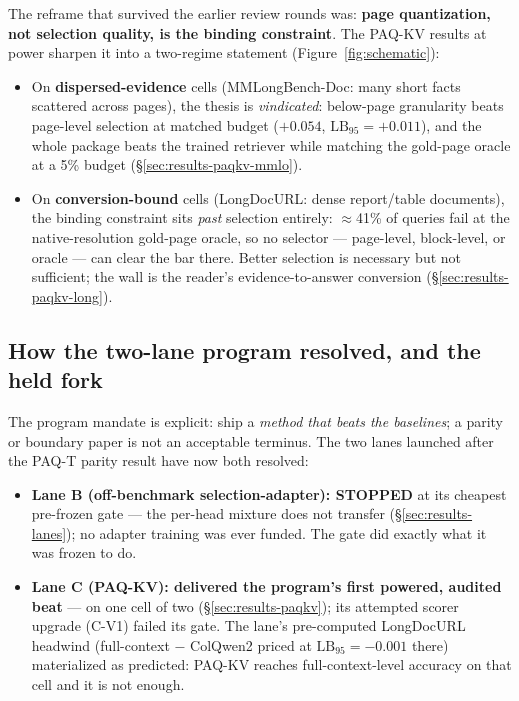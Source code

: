 \documentclass[11pt,letterpaper]{article}
\newcommand{\paqt}{\textsc{PAQ-T}}
\newcommand{\paqc}{\textsc{PAQ-KV}}
\newcommand{\lb}{\mathrm{LB}_{95}}
\begin{document}
The reframe that survived the earlier review rounds was: \textbf{page quantization, not
selection quality, is the binding constraint}. The \paqc{} results at power sharpen it into a
two-regime statement (Figure~\ref{fig:schematic}):
\begin{itemize}
  \item On \textbf{dispersed-evidence} cells (MMLongBench-Doc: many short facts scattered
        across pages), the thesis is \emph{vindicated}: below-page granularity beats
        page-level selection at matched budget ($+0.054$, $\lb=+0.011$), and the whole package
        beats the trained retriever while matching the gold-page oracle at a 5\% budget
        (\S\ref{sec:results-paqkv-mmlo}).
  \item On \textbf{conversion-bound} cells (LongDocURL: dense report/table documents), the
        binding constraint sits \emph{past} selection entirely: $\approx$41\% of queries fail
        at the native-resolution gold-page oracle, so no selector --- page-level, block-level,
        or oracle --- can clear the bar there. Better selection is necessary but not
        sufficient; the wall is the reader's evidence-to-answer conversion
        (\S\ref{sec:results-paqkv-long}).
\end{itemize}

\subsection{How the two-lane program resolved, and the held fork}\label{sec:roadmap-lanes}
The program mandate is explicit: ship a \emph{method that beats the baselines}; a parity or
boundary paper is not an acceptable terminus. The two lanes launched after the \paqt{} parity
result have now both resolved:
\begin{itemize}
  \item \textbf{Lane B (off-benchmark selection-adapter): STOPPED} at its cheapest pre-frozen
        gate --- the per-head mixture does not transfer (\S\ref{sec:results-lanes}); no
        adapter training was ever funded. The gate did exactly what it was frozen to do.
  \item \textbf{Lane C (\paqc{}): delivered the program's first powered, audited beat} --- on
        one cell of two (\S\ref{sec:results-paqkv}); its attempted scorer upgrade (C-V1)
        failed its gate. The lane's pre-computed LongDocURL headwind (full-context $-$
        ColQwen2 priced at $\lb=-0.001$ there) materialized as predicted: \paqc{} reaches
        full-context-level accuracy on that cell and it is not enough.
\end{itemize}
\end{document}
